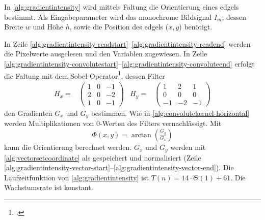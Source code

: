 In \autoref{alg:gradientintensity} wird mittels Faltung die Orientierung eines \glspl{edgel} bestimmt. Als
 Eingabeparameter wird das monochrome Bildsignal $I_m$, dessen Breite $w$ und Höhe $h$, sowie die Position des
 \glspl{edgel} ($x,y$) benötigt.

In Zeile \ref{alg:gradientintensity-readstart}--\ref{alg:gradientintensity-readend} werden die Pixelwerte ausgelesen
 und den Variablen zugewiesen. In Zeile
 \ref{alg:gradientintensity-convolutestart}--\ref{alg:gradientintensity-convoluteend} erfolgt die Faltung mit dem
 Sobel-Operator\footcite[Vgl.][S.~120--123]{burger05}, dessen Filter
\begin{subequations}
\begin{align}
	H_x =&
	\begin{pmatrix}
		1& 0& -1\\
		2& 0& -2\\
		1& 0& -1
	\end{pmatrix}
\end{align}
\begin{align}
	H_y =&
	\begin{pmatrix}
		1& 2& 1\\
		0& 0& 0\\
		-1& -2& -1
	\end{pmatrix}
\end{align}
\end{subequations}
den Gradienten $G_x$ und $G_y$ bestimmen. Wie in \autoref{alg:convolutekernel-horizontal} werden Multiplikationen von
 $0$-Werten des Filters vernachlässigt. Mit
\begin{equation}
	\label{eq:orientation}
	\Phi(x,y) = \arctan{\left(\tfrac{G_y}{G_x}\right)}
\end{equation}
kann die Orientierung berechnet werden. $G_x$ und $G_y$ werden mit \autoref{alg:vectorsetcoordinate} als
  gespeichert und normalisiert
 (Zeile \ref{alg:gradientintensity-vector-start}--\ref{alg:gradientintensity-vector-end}). Die Laufzeitfunktion von
 \autoref{alg:gradientintensity} ist $T(n) = 14 \cdot \Theta(1) + 61$. Die Wachstumsrate ist konstant.

